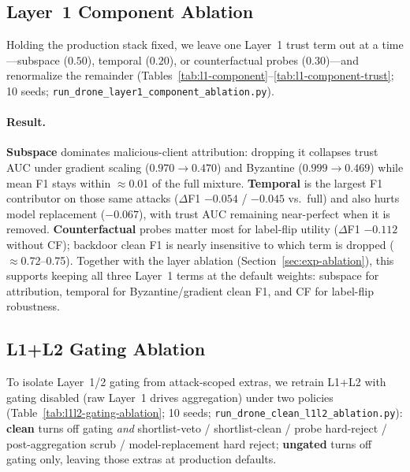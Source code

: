 \subsection{Layer~1 Component Ablation}
\label{sec:exp-l1-components}

Holding the production stack fixed, we leave one Layer~1 trust term out at a time---subspace ($0.50$), temporal ($0.20$), or counterfactual probes ($0.30$)---and renormalize the remainder (Tables~\ref{tab:l1-component}--\ref{tab:l1-component-trust}; 10 seeds; \texttt{run\_drone\_layer1\_component\_ablation.py}).

\paragraph{Result.}
\textbf{Subspace} dominates malicious-client attribution: dropping it collapses trust AUC under gradient scaling ($0.970\to 0.470$) and Byzantine ($0.999\to 0.469$) while mean F1 stays within $\approx$0.01 of the full mixture.
\textbf{Temporal} is the largest F1 contributor on those same attacks ($\Delta$F1 $-0.054$ / $-0.045$ vs.\ full) and also hurts model replacement ($-0.067$), with trust AUC remaining near-perfect when it is removed.
\textbf{Counterfactual} probes matter most for label-flip utility ($\Delta$F1 $-0.112$ without CF); backdoor clean F1 is nearly insensitive to which term is dropped ($\approx$0.72--0.75).
Together with the layer ablation (Section~\ref{sec:exp-ablation}), this supports keeping all three Layer~1 terms at the default weights: subspace for attribution, temporal for Byzantine/gradient clean F1, and CF for label-flip robustness.

\subsection{L1+L2 Gating Ablation}
\label{sec:exp-l1l2-gating}

To isolate Layer~1/2 gating from attack-scoped extras, we retrain L1+L2 with gating disabled (raw Layer~1 drives aggregation) under two policies (Table~\ref{tab:l1l2-gating-ablation}; 10 seeds; \texttt{run\_drone\_clean\_l1l2\_ablation.py}):
\textbf{clean} turns off gating \emph{and} shortlist-veto / shortlist-clean / probe hard-reject / post-aggregation scrub / model-replacement hard reject;
\textbf{ungated} turns off gating only, leaving those extras at production defaults.

